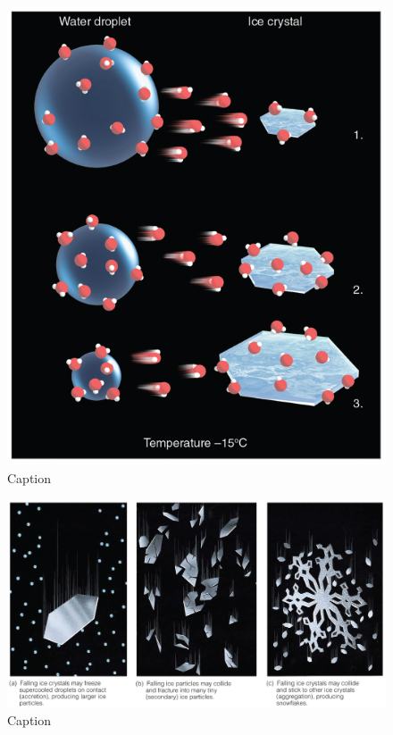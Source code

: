 \documentclass[12pt,oneside]{book}
\begin{document}
\begin{figure}

{\centering \includegraphics[width=0.9\linewidth]{figures/Figure331} 

}

\caption{Caption}\label{fig:Bergeron3}
\end{figure}

\begin{figure}

{\centering \includegraphics[width=0.9\linewidth]{figures/Figure332} 

}

\caption{Caption}\label{fig:Bergeron4}
\end{figure}
\end{document}
